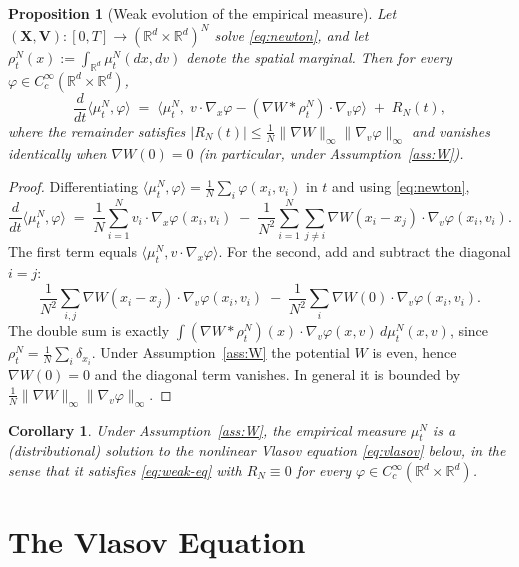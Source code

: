 \documentclass[11pt]{article}
\newtheorem{proposition}[theorem]{Proposition}
\newtheorem{corollary}[theorem]{Corollary}
\theoremstyle{definition}
\theoremstyle{remark}
\newcommand{\R}{\mathbb{R}}
\newcommand{\X}{\mathbf{X}}
\newcommand{\V}{\mathbf{V}}
\begin{document}
\begin{proposition}[Weak evolution of the empirical measure]\label{prop:weak}
Let $(\X, \V) : [0,T] \to (\R^d \times \R^d)^N$ solve \eqref{eq:newton}, and let
$\rho_t^N(x) := \int_{\R^d} \mu_t^N(dx, dv)$ denote the spatial marginal. Then for every
$\varphi \in C_c^\infty(\R^d \times \R^d)$,
\begin{equation}
  \frac{d}{dt} \langle \mu_t^N, \varphi \rangle
  \;=\; \big\langle \mu_t^N,\; v \cdot \nabla_x \varphi - (\nabla W * \rho_t^N) \cdot \nabla_v \varphi \big\rangle
  \;+\; R_N(t),
  \label{eq:weak-eq}
\end{equation}
where the remainder satisfies $|R_N(t)| \le \frac{1}{N} \|\nabla W\|_\infty \|\nabla_v \varphi\|_\infty$
and vanishes identically when $\nabla W(0) = 0$ (in particular, under Assumption~\ref{ass:W}).
\end{proposition}

\begin{proof}
Differentiating $\langle \mu_t^N, \varphi \rangle = \frac{1}{N} \sum_i \varphi(x_i, v_i)$ in $t$ and
using \eqref{eq:newton},
\[
  \frac{d}{dt} \langle \mu_t^N, \varphi \rangle
  \;=\; \frac{1}{N} \sum_{i=1}^{N} v_i \cdot \nabla_x \varphi(x_i, v_i)
  \;-\; \frac{1}{N^2} \sum_{i=1}^{N} \sum_{j \neq i} \nabla W(x_i - x_j) \cdot \nabla_v \varphi(x_i, v_i).
\]
The first term equals $\langle \mu_t^N, v \cdot \nabla_x \varphi \rangle$. For the second,
add and subtract the diagonal $i = j$:
\[
  \frac{1}{N^2} \sum_{i,j} \nabla W(x_i - x_j) \cdot \nabla_v \varphi(x_i, v_i)
  \;-\; \frac{1}{N^2} \sum_i \nabla W(0) \cdot \nabla_v \varphi(x_i, v_i).
\]
The double sum is exactly $\int (\nabla W * \rho_t^N)(x) \cdot \nabla_v \varphi(x, v) \, d\mu_t^N(x,v)$,
since $\rho_t^N = \frac{1}{N} \sum_i \delta_{x_i}$. Under Assumption~\ref{ass:W} the potential
$W$ is even, hence $\nabla W(0) = 0$ and the diagonal term vanishes. In general it is bounded
by $\frac{1}{N} \|\nabla W\|_\infty \|\nabla_v \varphi\|_\infty$.
\end{proof}

\begin{corollary}\label{cor:empirical-vlasov}
Under Assumption~\ref{ass:W}, the empirical measure $\mu_t^N$ is a (distributional) solution
to the nonlinear Vlasov equation \eqref{eq:vlasov} below, in the sense that it satisfies
\eqref{eq:weak-eq} with $R_N \equiv 0$ for every $\varphi \in C_c^\infty(\R^d \times \R^d)$.
\end{corollary}

\section{The Vlasov Equation}
\end{document}
